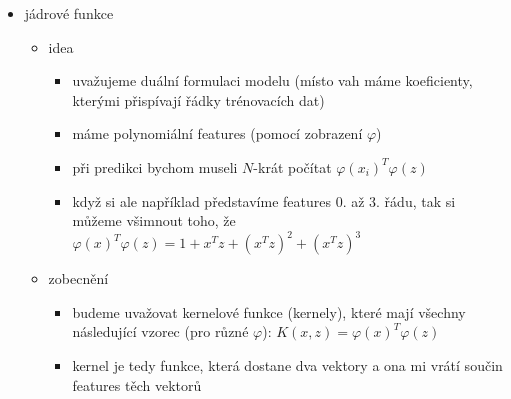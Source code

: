 \begin{itemize}
\begin{itemize}
\begin{itemize}
\end{itemize}
\item support vektory teďka nebudou jenom body na okrajích marginu, ale i všechny, které mají kladné $\xi_i$ (jsou divné)
\item pozorování: $\xi_i=\max(0,1-t_iy(x_i))$
\begin{itemize}
\item téhle funkci se říká hinge loss
\end{itemize}
\item soft-margin SVM lze vlastně formulovat jako $\text{argmin}_{w,b}\,C\sum_i\mathcal L_\mathrm{hinge}(t_i,y(x_i))+\frac12\|w\|^2$
\begin{itemize}
\item to nám hodně připomíná klasický vzorec pro logistickou regresi apod.
\item akorát místo regularizační konstanty $\lambda$ tady máme $C$, které hraje opačnou roli (čím větší $C$, tím slabší regularizace)
\end{itemize}
\item k trénování se používá sequential minimal optimization
\begin{itemize}
\item bereme řádky po jednom, k tomu $a_i$, náhodně $a_j$ a taky bias, postupně zlepšujeme lagrangián
\end{itemize}
\end{itemize}
\item jádrové funkce
\begin{itemize}
\item idea
\begin{itemize}
\item uvažujeme duální formulaci modelu (místo vah máme koeficienty, kterými přispívají řádky trénovacích dat)
\item máme polynomiální features (pomocí zobrazení $\varphi$)
\item při predikci bychom museli $N$-krát počítat $\varphi(x_i)^T\varphi(z)$
\item když si ale například představíme features 0. až 3. řádu, tak si můžeme všimnout toho, že $\varphi(x)^T\varphi(z)=1+x^Tz+(x^Tz)^2+(x^Tz)^3$
\end{itemize}
\item zobecnění
\begin{itemize}
\item budeme uvažovat kernelové funkce (kernely), které mají všechny následující vzorec (pro různé $\varphi$): $K(x,z)=\varphi(x)^T\varphi(z)$
\item kernel je tedy funkce, která dostane dva vektory a ona mi vrátí součin features těch vektorů

\end{itemize}
\end{itemize}
\end{itemize}

